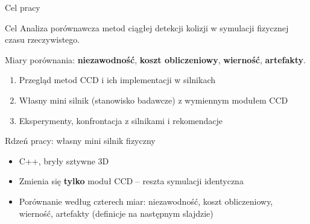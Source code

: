 \documentclass[aspectratio=169, 11pt]{beamer}
\begin{document}
\begin{frame}{Cel pracy}
  \begin{block}{Cel}
    \large
    Analiza porównawcza metod ciągłej detekcji kolizji
    w symulacji fizycznej czasu rzeczywistego.
  \end{block}
  \vspace{0.15cm}
  {\small Miary porównania: \textbf{niezawodność}, \textbf{koszt obliczeniowy}, \textbf{wierność}, \textbf{artefakty}.\par}
  \vspace{0.3cm}
  \begin{enumerate}\itemsep0.3em
    \item Przegląd metod CCD i ich implementacji w silnikach
    \item Własny mini silnik (stanowisko badawcze) z wymiennym modułem CCD
    \item Eksperymenty, konfrontacja z silnikami i rekomendacje
  \end{enumerate}
\end{frame}
 
\begin{frame}{Rdzeń pracy: własny mini silnik fizyczny}
  \begin{center}
  \end{center}
  \vspace{0.3cm}
  \begin{itemize}\itemsep0.3em
    \item C++, bryły sztywne 3D
    \item Zmienia się \textbf{tylko} moduł CCD -- reszta symulacji identyczna
    \item Porównanie według czterech miar: niezawodność, koszt obliczeniowy, wierność, artefakty (definicje na następnym slajdzie)
  \end{itemize}
\end{frame}
\end{document}

